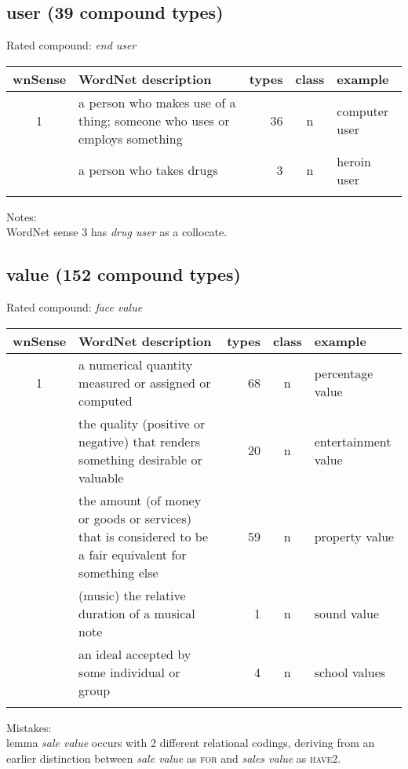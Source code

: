 \subsection{user      (39 compound types)}
Rated compound: \emph{end user}

\vspace*{1ex}

\noindent
\begin{longtable}{c>{\raggedright\arraybackslash}p{5cm}rc>{\raggedright\arraybackslash}p{2cm}}\lsptoprule
{\small wnSense}&WordNet description&types&class&example\\\midrule
1&a person who makes use of a thing; someone who uses or employs something&36&n&computer user\\\tablevspace
3&a person who takes drugs&3&n&heroin user\\\lspbottomrule
\end{longtable}

\noindent
Notes:\\
WordNet sense 3 has \emph{drug user} as a collocate.
\pagebreak[4]
\subsection{value     (152 compound types)}
Rated compound: \emph{face value}

\vspace*{1ex}

\noindent
\begin{longtable}{c>{\raggedright\arraybackslash}p{5cm}rc>{\raggedright\arraybackslash}p{2cm}}\lsptoprule
{\small wnSense}&WordNet description&types&class&example\\\midrule
1&a numerical quantity measured or assigned or computed&68&n&percentage value\\\tablevspace
2&the quality (positive or negative) that renders something desirable or valuable&20&n&entertain\-ment value\\\tablevspace
3&the amount (of money or goods or services) that is considered to be a fair equivalent for something else&59&n&property value\\\tablevspace
5&(music) the relative duration of a musical note&1&n&sound value\\\tablevspace
6&an ideal accepted by some individual or group&4&n&school values\\\lspbottomrule
\end{longtable}

\noindent
Mistakes:\\ lemma \emph{sale value} occurs with 2 different relational codings, deriving from an earlier distinction between \emph{sale value} as \textsc{for} and \emph{sales value} as \textsc{have2}.

